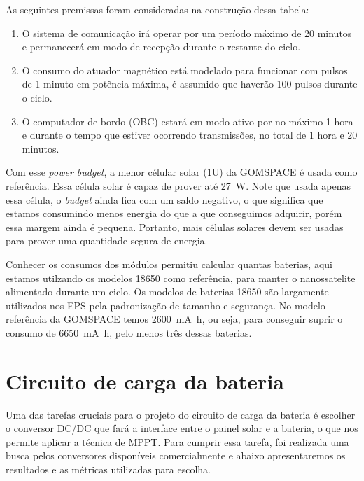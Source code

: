 
As seguintes premissas foram consideradas na construção dessa tabela:

\begin{enumerate}
    \item O sistema de comunicação irá operar por um período máximo de 20 minutos e permanecerá em modo de recepção durante o restante do ciclo.
    \item O consumo do atuador magnético está modelado para funcionar com pulsos de 1 minuto em potência máxima, é assumido que haverão 100 pulsos durante o ciclo.
    \item O computador de bordo (OBC) estará em modo ativo por no máximo 1 hora e durante o tempo que estiver ocorrendo transmissões, no total de 1 hora e 20 minutos.
\end{enumerate}

Com esse \textit{power budget}, a menor célular solar (1U) da GOMSPACE é usada como referência. Essa célula solar é capaz de prover até \SI{27}{\watt}. Note que usada apenas essa célula, o \textit{budget} ainda fica com um saldo negativo, o que significa que estamos consumindo menos energia do que a que conseguimos adquirir, porém essa margem ainda é pequena. Portanto, mais células solares devem ser usadas para prover uma quantidade segura de energia.

Conhecer os consumos dos módulos permitiu calcular quantas baterias, aqui estamos utilzando os modelos 18650 como referência, para manter o nanossatelite alimentado durante um ciclo. Os modelos de baterias 18650 são largamente utilizados nos EPS pela padronização de tamanho e segurança. No modelo referência da GOMSPACE temos \SI{2600}{\milli\ampere\hour}, ou seja, para conseguir suprir o consumo de \SI{6650}{\milli\ampere\hour}, pelo menos três dessas baterias.

\section{Circuito de carga da bateria}

Uma das tarefas cruciais para o projeto do circuito de carga da bateria é escolher o conversor DC/DC que fará a interface entre o painel solar e a bateria, o que nos permite aplicar a técnica de MPPT. Para cumprir essa tarefa, foi realizada uma busca pelos conversores disponíveis comercialmente e abaixo apresentaremos os resultados e as métricas utilizadas para escolha.


